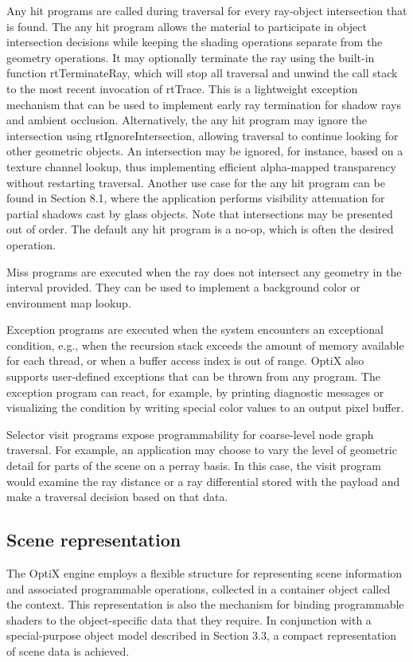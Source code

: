 Any hit programs are called during traversal for every ray-object
intersection that is found. The any hit program allows the material to participate in object intersection decisions while keeping the shading operations separate from the geometry operations. It may optionally terminate the ray using the built-in function rtTerminateRay, which will stop all traversal and unwind the
call stack to the most recent invocation of rtTrace. This is a
lightweight exception mechanism that can be used to implement
early ray termination for shadow rays and ambient occlusion. Alternatively, the any hit program may ignore the intersection using rtIgnoreIntersection, allowing traversal to continue looking for
other geometric objects. An intersection may be ignored, for instance, 
based on a texture channel lookup, 
thus implementing efficient alpha-mapped transparency without restarting traversal. 
Another use case for the any hit program can be found in Section 8.1,
where the application performs visibility attenuation for partial
shadows cast by glass objects. Note that intersections may be presented out of order. The default any hit program is a no-op, which
is often the desired operation.

Miss programs are executed when the ray does not intersect any
geometry in the interval provided. They can be used to implement
a background color or environment map lookup.

Exception programs are executed when the system encounters an
exceptional condition, e.g., when the recursion stack exceeds the
amount of memory available for each thread, or when a buffer access index is out of range. OptiX also supports user-defined exceptions that can be thrown from any program. The exception program
can react, for example, by printing diagnostic messages or visualizing the condition by writing special color values to an output pixel
buffer.

Selector visit programs expose programmability for coarse-level
node graph traversal. For example, an application may choose to
vary the level of geometric detail for parts of the scene on a perray basis. In this case, the visit program would examine the ray
distance or a ray differential stored with the payload and make a
traversal decision based on that data.

\subsection{Scene representation}

The OptiX engine employs a flexible structure for representing
scene information and associated programmable operations, collected in a container object called the context. This representation is also the mechanism for binding programmable shaders to
the object-specific data that they require. In conjunction with a
special-purpose object model described in Section 3.3, a compact
representation of scene data is achieved.

